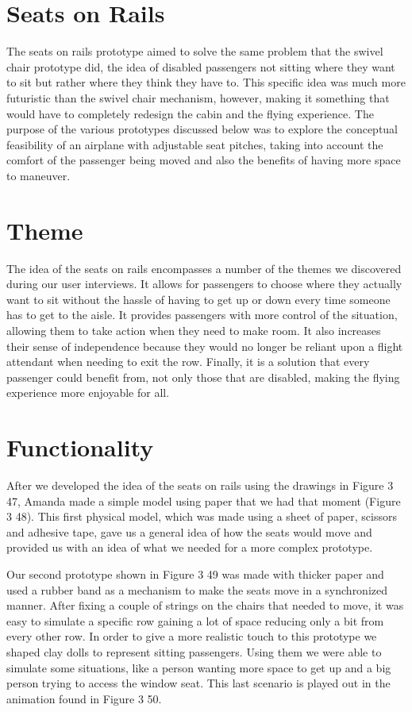 \section{Seats on Rails}
The seats on rails prototype aimed to solve the same problem that the swivel chair prototype did, the idea of disabled passengers not sitting where they want to sit but rather where they think they have to. This specific idea was much more futuristic than the swivel chair mechanism, however, making it something that would have to completely redesign the cabin and the flying experience. The purpose of the various prototypes discussed below was to explore the conceptual feasibility of an airplane with adjustable seat pitches, taking into account the comfort of the passenger being moved and also the benefits of having more space to maneuver.

\section*{Theme}
The idea of the seats on rails encompasses a number of the themes we discovered during our user interviews. It allows for passengers to choose where they actually want to sit without the hassle of having to get up or down every time someone has to get to the aisle. It provides passengers with more control of the situation, allowing them to take action when they need to make room. It also increases their sense of independence because they would no longer be reliant upon a flight attendant when needing to exit the row. Finally, it is a solution that every passenger could benefit from, not only those that are disabled, making the flying experience more enjoyable for all.

\section*{Functionality}
After we developed the idea of the seats on rails using the drawings in Figure 3 47, Amanda made a simple model using paper that we had that moment (Figure 3 48). This first physical model, which was made using a sheet of paper, scissors and adhesive tape, gave us a general idea of how the seats would move and provided us with an idea of what we needed for a more complex prototype.

Our second prototype shown in Figure 3 49 was made with thicker paper and used a rubber band as a mechanism to make the seats move in a synchronized manner. After fixing a couple of strings on the chairs that needed to move, it was easy to simulate a specific row gaining a lot of space reducing only a bit from every other row. In order to give a more realistic touch to this prototype we shaped clay dolls to represent sitting passengers. Using them we were able to simulate some situations, like a person wanting more space to get up and a big person trying to access the window seat. This last scenario is played out in the animation found in Figure 3 50.

